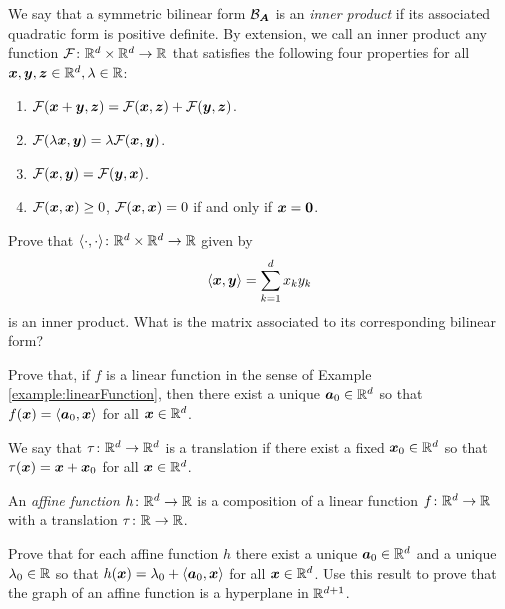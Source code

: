 \begin{example}\label{example:innerprod}
We say that a symmetric bilinear form $\mathcal{B}_{\boldsymbol{A}}$ is an \emph{inner product} if its associated quadratic form is positive definite.  By extension, we call an inner product any function $\mathcal{F} \colon \mathbb{R}^d \times \mathbb{R}^d \to \mathbb{R}$ that satisfies the following four properties for all $\boldsymbol{x}, \boldsymbol{y}, \boldsymbol{z} \in \mathbb{R}^d, \lambda \in \mathbb{R}$:
\begin{enumerate}
\item $\mathcal{F}(\boldsymbol{x}+\boldsymbol{y}, \boldsymbol{z}) = \mathcal{F}(\boldsymbol{x}, \boldsymbol{z}) + \mathcal{F}(\boldsymbol{y}, \boldsymbol{z})$.
\item $\mathcal{F}(\lambda \boldsymbol{x}, \boldsymbol{y}) = \lambda \mathcal{F}(\boldsymbol{x}, \boldsymbol{y})$.
\item $\mathcal{F}(\boldsymbol{x}, \boldsymbol{y}) = \mathcal{F}(\boldsymbol{y}, \boldsymbol{x})$.
\item $\mathcal{F}(\boldsymbol{x}, \boldsymbol{x}) \geq 0$, $\mathcal{F}(\boldsymbol{x}, \boldsymbol{x}) = 0$ if and only if $\boldsymbol{x} = \boldsymbol{0}$.
\end{enumerate}
\end{example}

\begin{problem}\label{problem:innerprodRd}
Prove that $\langle \cdot, \cdot \rangle \colon \mathbb{R}^d \times \mathbb{R}^d \to \mathbb{R}$ given by
\begin{equation*}
\langle \boldsymbol{x}, \boldsymbol{y} \rangle = \sum_{k=1}^d x_k y_k
\end{equation*}
is an inner product.  What is the matrix associated to its corresponding bilinear form?
\end{problem}

\begin{problem}\label{problem:linearFunction}
Prove that, if $f$ is a linear function in the sense of Example \ref{example:linearFunction}, then there exist a unique $\boldsymbol{a}_0 \in \mathbb{R}^d$ so that $f(\boldsymbol{x})=\langle \boldsymbol{a}_0, \boldsymbol{x} \rangle$ for all $\boldsymbol{x} \in \mathbb{R}^d$.
\end{problem}

\begin{problem}\label{problem:affineFunction}
We say that $\tau\colon \mathbb{R}^d \to \mathbb{R}^d$ is a translation if there exist a fixed $\boldsymbol{x}_0 \in \mathbb{R}^d$ so that $\tau(\boldsymbol{x}) = \boldsymbol{x} + \boldsymbol{x}_0$ for all $\boldsymbol{x} \in \mathbb{R}^d$.

An \emph{affine function} $h\colon \mathbb{R}^d \to \mathbb{R}$ is a composition of a linear function $f\colon \mathbb{R}^d \to \mathbb{R}$ with a translation $\tau\colon \mathbb{R} \to \mathbb{R}$.

Prove that for each affine function $h$ there exist a unique $\boldsymbol{a}_0 \in \mathbb{R}^d$ and a unique $\lambda_0 \in \mathbb{R}$ so that $h(\boldsymbol{x}) = \lambda_0 + \langle \boldsymbol{a}_0, \boldsymbol{x} \rangle$ for all $\boldsymbol{x} \in \mathbb{R}^d$.  Use this result to prove that the graph of an affine function is a hyperplane in $\mathbb{R}^{d+1}$.
\end{problem}

